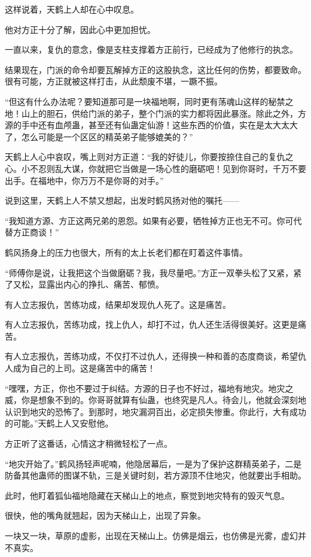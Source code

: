 \begin{this_body}
这样说着，天鹤上人却在心中叹息。

他对方正十分了解，因此心中更加担忧。

一直以来，复仇的意念，像是支柱支撑着方正前行，已经成为了他修行的执念。

结果现在，门派的命令却要瓦解掉方正的这股执念，这比任何的伤势，都要致命。很有可能，方正就被这样打击，从此颓废不堪，一蹶不振。

“但这有什么办法呢？要知道那可是一块福地啊，同时更有荡魂山这样的秘禁之地！山上的胆石，供给门派的弟子，整个门派的实力都将因此暴涨。除此之外，方源的手中还有血颅蛊，甚至还有仙蛊定仙游！这些东西的价值，实在是太大太大了，怎么可能是一个区区的精英弟子能够媲美的？”

天鹤上人心中哀叹，嘴上则对方正道：“我的好徒儿，你要按捺住自己的复仇之心。小不忍则乱大谋，你就把它当做是一场心性的磨砺吧！见到你哥时，千万不要出手。在福地中，你万万不是你哥的对手。”

说到这里，天鹤上人不禁又想起，出发时鹤风扬对他的嘱托——

“我知道方源、方正这两兄弟的恩怨。如果有必要，牺牲掉方正也无不可。你可代替方正商谈！”

鹤风扬身上的压力也很大，所有的太上长老们都在盯着这件事情。

“师傅你是说，让我把这个当做磨砺？我，我尽量吧。”方正一双拳头松了又紧，紧了又松，显露出内心的挣扎、痛苦、郁愤。

有人立志报仇，苦练功成，结果却发现仇人死了。这是痛苦。

有人立志报仇，苦练功成，找上仇人，却打不过，仇人还生活得很美好。这更是痛苦。

有人立志报仇，苦练功成，不仅打不过仇人，还得换一种和善的态度商谈，希望仇人成为自己的上司。这是痛苦中的痛苦！

“嘿嘿，方正，你也不要过于纠结。方源的日子也不好过，福地有地灾。地灾之威，你是想象不到的。你哥哥就算有仙蛊，也终究是凡人。待会儿，他就会深刻地认识到地灾的恐怖了。到那时，地灾漏洞百出，必定损失惨重。你此行，大有成功的可能。”天鹤上人又安慰他。

方正听了这番话，心情这才稍微轻松了一点。

“地灾开始了。”鹤风扬轻声呢喃，他隐居幕后，一是为了保护这群精英弟子，二是防备其他蛊师的图谋不轨，三是关键时刻，若方源顶不住地灾，他就要出手相助。

此时，他盯着狐仙福地隐藏在天梯山上的地点，察觉到地灾特有的毁灭气息。

很快，他的嘴角就翘起，因为天梯山上，出现了异象。

一块又一块，草原的虚影，出现在天梯山上。仿佛是烟云，也仿佛是光雾，虚幻并不真实。


\end{this_body}
